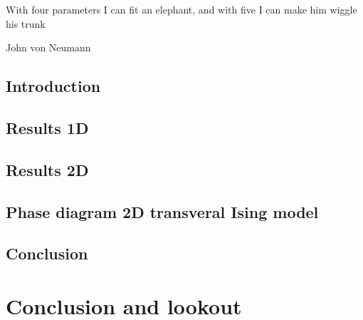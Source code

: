 \documentclass{book}
\newcounter{a}
\newcounter{b}
\begin{document}
\epigraph{With four parameters I can fit an elephant, and with five I can make him wiggle his trunk}{John von Neumann}

%

\section{Introduction}


\section{Results 1D}\label{sec:results1d}


\section{Results 2D}\label{sec:results2d}


\section{Phase diagram 2D transveral Ising model} \label{subsec:2dpahsediag}


\section{Conclusion}


\chapter{Conclusion and lookout}






\clearpage{\thispagestyle{empty}\cleardoublepage}
\end{document}
